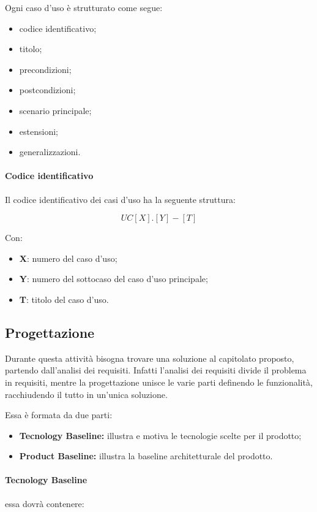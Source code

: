 Ogni caso d'uso è strutturato come segue:
\begin{itemize}
    \item codice identificativo;
    \item titolo;
    \item precondizioni;
    \item postcondizioni;
    \item scenario principale;
    \item estensioni;
    \item generalizzazioni.
\end{itemize}

\paragraph{Codice identificativo} Il codice identificativo dei casi d'uso ha la seguente struttura:

\[UC[X].[Y]-[T]\]

Con:
\begin{itemize}
    \item \textbf{X}: numero del caso d'uso;
    \item \textbf{Y}: numero del sottocaso del caso d'uso principale;
    \item \textbf{T}: titolo del caso d'uso.
\end{itemize}

\subsection{Progettazione}
Durante questa attività bisogna trovare una soluzione al capitolato proposto, partendo dall'analisi dei requisiti. Infatti l'analisi dei requisiti divide il problema in requisiti, mentre la progettazione unisce le varie parti definendo le funzionalità, racchiudendo il tutto in un'unica soluzione.

Essa è formata da due parti:
\begin{itemize}
    \item \textbf{Tecnology Baseline:} illustra e motiva le tecnologie scelte per il prodotto;
    \item \textbf{Product Baseline:} illustra la baseline architetturale del prodotto.
\end{itemize}

\paragraph{Tecnology Baseline} essa dovrà contenere:

